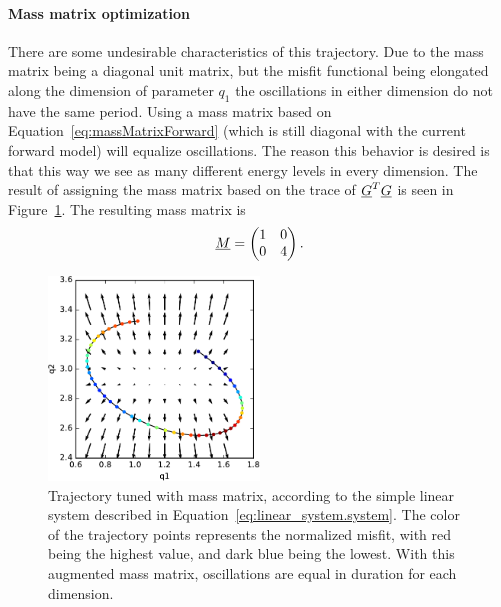 \paragraph{Mass matrix optimization}There are some undesirable characteristics of this trajectory. Due to the mass matrix being a diagonal unit matrix, but the misfit functional being elongated along the dimension of parameter $q_1$ the oscillations in either dimension do not have the same period. Using a mass matrix based on Equation~\eqref{eq:massMatrixForward} (which is still diagonal with the current forward model) will equalize oscillations. The reason this behavior is desired is that this way we see as many different energy levels in every dimension. The result of assigning the mass matrix based on the trace of $\underline{G}^T\underline{G}$ is seen in Figure~\ref{fig:linear_system.trajectory_massTuned}. The resulting mass matrix is ~
\begin{gather}\label{eq:linear_system.massMatrix}
\underline{M} = 
\begin{pmatrix}
1 & 0\\
0 & 4\\
\end{pmatrix}.
\end{gather}

\begin{figure}
	\centering
	
	\includegraphics[width=0.5\textwidth]{figures/linear_systems/trajectory_massTuned}
	
	\caption{Trajectory tuned with mass matrix, according to the simple linear system described in Equation~\eqref{eq:linear_system.system}. The color of the trajectory points represents the normalized misfit, with red being the highest value, and dark blue being the lowest. With this augmented mass matrix, oscillations are equal in duration for each dimension.}
	\label{fig:linear_system.trajectory_massTuned}
\end{figure}

